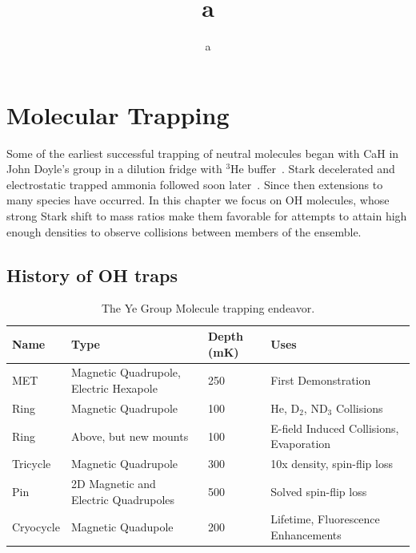 \documentclass[defaultstyle,11pt]{thesis}
\title{a}
\author{a}{a}
\begin{document}


\chapter{Molecular Trapping}

Some of the earliest successful trapping of neutral molecules began with CaH in John Doyle's group in a dilution fridge with $^3$He buffer~\cite{Weinstein1998}.
Stark decelerated and electrostatic trapped ammonia followed soon later~\cite{Bethlem2000trap}.
Since then extensions to many species have occurred. 
In this chapter we focus on OH molecules, whose strong Stark shift to mass ratios make them favorable for attempts to attain high enough densities to observe collisions between members of the ensemble.

\section{History of OH traps}

\renewcommand{\arraystretch}{1.5}
\begin{table}[t!]
\centering
\caption{
The Ye Group Molecule trapping endeavor.\label{trappingtable}
}
\label{tab:rates}
\begin{tabular}{ L{2.5cm} | C{4.5cm} C{2.5cm} C{4.5cm} }
Name & Type & Depth (mK) & Uses \\
\hline\hline
MET 	& Magnetic Quadrupole, Electric Hexapole & 250 	& First Demonstration~\cite{Sawyer2007} 	 \\
\hline
Ring 		& Magnetic Quadrupole				& 100 	& He, D$_2$, ND$_3$ Collisions~\cite{Sawyer2008,Sawyer2011} \\
\hline
Ring 		& Above, but new mounts				& 100 	& E-field Induced Collisions,  Evaporation~\cite{Stuhl2012uwave,Stuhl2012evap,Stuhl2013} \\
\hline
Tricycle 	& Magnetic Quadrupole 				& 300 	& 10x density, spin-flip loss \\
\hline
Pin  		& 2D Magnetic and Electric Quadrupoles 	& 500 	& Solved spin-flip loss~\cite{Reens2017}\\
\hline
Cryocycle 	& Magnetic Quadupole 				& 200 	& Lifetime, Fluorescence Enhancements\\
\end{tabular}
\end{table}
\end{document}
